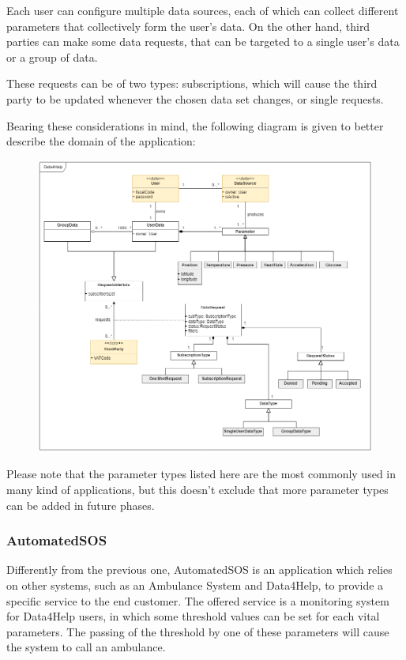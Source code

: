 Each user can configure multiple data sources, each of which can collect different parameters that collectively form the user's data. On the other hand, third parties can make some data requests, that can be targeted to a single user's data or a group of data.

These requests can be of two types: subscriptions, which will cause the third party to be updated whenever the chosen data set changes, or single requests.

Bearing these considerations in mind, the following diagram is given to better describe the domain of the application:

\begin{figure}[h!]
	\centering
	\includegraphics[width = \linewidth] {../Diagrams/ClassDiagram-General.png}\\[1.0 cm]
\end{figure}

Please note that the parameter types listed here are the most commonly used in many kind of applications, but this doesn't exclude that more parameter types can be added in future phases.
\newpage

\subsubsection{AutomatedSOS}
Differently from the previous one, AutomatedSOS is an application which relies on other systems, such as an Ambulance System and Data4Help, to provide a specific service to the end customer. 
The offered service is a monitoring system for Data4Help users, in which some threshold values can be set for each vital parameters. The passing of the threshold by one of these parameters will cause the system to call an ambulance.

